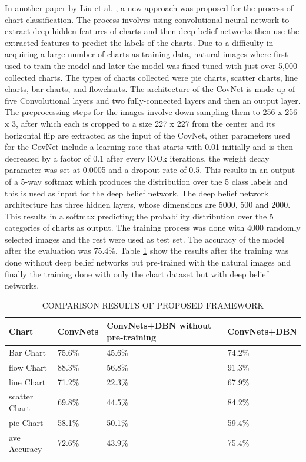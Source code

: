\documentclass[12pt, a4paper,oneside]{report}
\begin{document}
In another paper by Liu et al. \cite{liu2015chart}, a new approach was proposed for the process of chart classification. The process involves using convolutional neural network to extract deep hidden features of charts and then deep belief networks then use the extracted features to predict the labels of the charts. Due to a difficulty in acquiring a large number of charts as training data, natural images where first used to train the model and later the model was fined tuned with just over 5,000 collected charts. The types of charts collected were pie charts, scatter charts, line charts, bar charts, and flowcharts. The architecture of the CovNet is made up of five Convolutional layers and two fully-connected layers and then an output layer. The preprocessing steps for the images involve down-sampling them to 256 x 256 x 3, after which each is cropped to a size 227 x 227 from the center and its horizontal flip are extracted as the input of the CovNet, other parameters used for the CovNet include a learning rate that starts with 0.01 initially and is then decreased by a factor of 0.1 after every lOOk iterations, the weight decay parameter was set at 0.0005 and a dropout rate of 0.5. This results in an output of a 5-way softmax which produces the distribution over the 5 class labels and this is used as input for the deep belief network. The deep belief network architecture has three hidden layers, whose dimensions are 5000, 500 and 2000. This results in a softmax predicting the probability
distribution over the 5 categories of charts as output.
The training process was done with 4000 randomly selected images and the rest were used as test set. The accuracy of the model after the evaluation was  75.4\%. Table \ref{table:deep} show the results after the training was done without deep belief networks but pre-trained with the natural images and finally the training done with only the chart dataset but with deep belief networks.

\begin{table}[h]
	\centering {} \small
	\begin{tabular}{|p{3cm}|p{3cm}|p{3cm}|p{3cm}|}
		
		\hline
		Chart & ConvNets&ConvNets+DBN without pre-training & ConvNets+DBN \\ \hline
				
		Bar Chart & 75.6\% & 45.6\% & 74.2\% \\ \hline
		flow Chart & 88.3\%  & 56.8\% & 91.3\%  \\ \hline
		line Chart  & 71.2\%  & 22.3\% & 67.9\% \\ \hline
	
		scatter Chart & 69.8\% & 44.5\% & 84.2\% \\ \hline
		pie Chart & 58.1\%  & 50.1\% & 59.4\%    \\ \hline
		ave Accuracy & 72.6\%  & 43.9\% & 75.4\% \\ \hline
		
	\end{tabular}
	\caption {COMPARISON RESULTS OF PROPOSED FRAMEWORK}	
	\label{table:deep}
	
\end{table}
\end{document}
